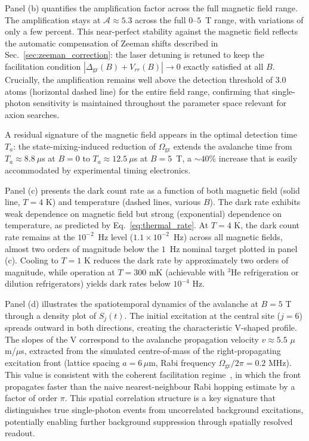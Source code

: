 Panel (b) quantifies the amplification factor across the full magnetic field range. The amplification stays at $\mathcal{A} \approx 5.3$ across the full $0$--$5$~T range, with variations of only a few percent. This near-perfect stability against the magnetic field reflects the automatic compensation of Zeeman shifts described in Sec.~\ref{sec:zeeman_correction}: the laser detuning is retuned to keep the facilitation condition $|\Delta_{\mathrm{gr}}(B)+V_{rr}(B)|\!\to\!0$ exactly satisfied at all $B$. Crucially, the amplification remains well above the detection threshold of 3.0 atoms (horizontal dashed line) for the entire field range, confirming that single-photon sensitivity is maintained throughout the parameter space relevant for axion searches.

A residual signature of the magnetic field appears in the optimal detection time $T_a$: the state-mixing-induced reduction of $\Omega_{\mathrm{gr}}$ extends the avalanche time from $T_a \approx 8.8~\mu$s at $B=0$ to $T_a \approx 12.5~\mu$s at $B=5$~T, a $\sim 40\%$ increase that is easily accommodated by experimental timing electronics.

Panel (c) presents the dark count rate as a function of both magnetic field (solid line, $T = 4$ K) and temperature (dashed lines, various $B$). The dark rate exhibits weak dependence on magnetic field but strong (exponential) dependence on temperature, as predicted by Eq.~\eqref{eq:thermal_rate}. At $T = 4$ K, the dark count rate remains at the $10^{-2}$~Hz level ($1.1\times10^{-2}$~Hz) across all magnetic fields, almost two orders of magnitude below the $1$~Hz nominal target plotted in panel (c). Cooling to $T = 1$ K reduces the dark rate by approximately two orders of magnitude, while operation at $T = 300$ mK (achievable with $^3$He refrigeration or dilution refrigerators) yields dark rates below $10^{-4}$ Hz.

Panel (d) illustrates the spatiotemporal dynamics of the avalanche at $B = 5$ T through a density plot of $S_j(t)$. The initial excitation at the central site ($j = 6$) spreads outward in both directions, creating the characteristic V-shaped profile. The slopes of the V correspond to the avalanche propagation velocity $v \approx 5.5$ $\mu$m/$\mu$s, extracted from the simulated centre-of-mass of the right-propagating excitation front (lattice spacing $a = 6\,\mu$m, Rabi frequency $\Omega_{\mathrm{gr}}/2\pi = 0.2$ MHz). This value is consistent with the coherent facilitation regime~\cite{Valado2016,Festa2022}, in which the front propagates faster than the naive nearest-neighbour Rabi hopping estimate by a factor of order $\pi$. This spatial correlation structure is a key signature that distinguishes true single-photon events from uncorrelated background excitations, potentially enabling further background suppression through spatially resolved readout.

